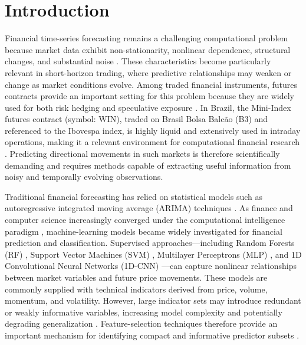 
\section{Introduction}\label{sec:introduction}



Financial time-series forecasting remains a challenging computational problem because market data exhibit non-stationarity, nonlinear dependence, structural changes, and substantial noise \cite{jesus2025tda, makridakis2018statistical}. These characteristics become particularly relevant in short-horizon trading, where predictive relationships may weaken or change as market conditions evolve. Among traded financial instruments, futures contracts provide an important setting for this problem because they are widely used for both risk hedging and speculative exposure \cite{jarrow1981forward, souza2025iccsa}. In Brazil, the Mini-Index futures contract (symbol: WIN), traded on Brasil Bolsa Balc\~{a}o (B3) and referenced to the Ibovespa index, is highly liquid and extensively used in intraday operations, making it a relevant environment for computational financial research \cite{souza2024dataset, cardoso2022bovdb}. Predicting directional movements in such markets is therefore scientifically demanding and requires methods capable of extracting useful information from noisy and temporally evolving observations.

Traditional financial forecasting has relied on statistical models such as autoregressive integrated moving average (ARIMA) techniques \cite{box2015time}. As finance and computer science increasingly converged under the computational intelligence paradigm \cite{jiang2021applications}, machine-learning models became widely investigated for financial prediction and classification. Supervised approaches---including Random Forests (RF) \cite{nabipour2020predicting}, Support Vector Machines (SVM) \cite{naik2019optimal}, Multilayer Perceptrons (MLP) \cite{ecer2020mlp_ga_pso}, and 1D Convolutional Neural Networks (1D-CNN) \cite{bandgar2025finchronos}---can capture nonlinear relationships between market variables and future price movements. These models are commonly supplied with technical indicators derived from price, volume, momentum, and volatility. However, large indicator sets may introduce redundant or weakly informative variables, increasing model complexity and potentially degrading generalization \cite{singh2022feature, lei2012feature}. Feature-selection techniques therefore provide an important mechanism for identifying compact and informative predictor subsets \cite{kumar2014feature, souza2025iccsa}.

